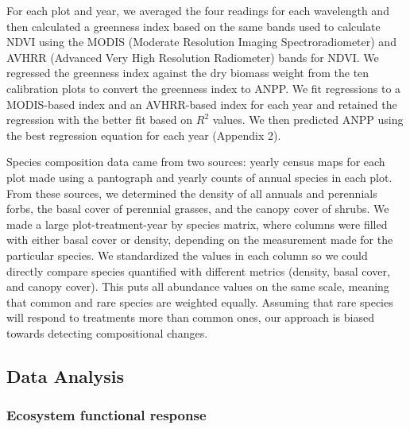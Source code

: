 \documentclass[fleqn,10pt,lineno]{wlpeerj} %
\begin{document}
For each plot and year, we averaged the four readings for each
wavelength and then calculated a greenness index based on the same bands
used to calculate NDVI using the MODIS (Moderate Resolution Imaging
Spectroradiometer) and AVHRR (Advanced Very High Resolution Radiometer)
bands for NDVI. We regressed the greenness index against the dry biomass
weight from the ten calibration plots to convert the greenness index to
ANPP. We fit regressions to a MODIS-based index and an AVHRR-based index
for each year and retained the regression with the better fit based on
\(R^2\) values. We then predicted ANPP using the best regression
equation for each year (Appendix 2).

Species composition data came from two sources: yearly census maps for
each plot made using a pantograph \citep{Hill1920} and yearly counts of
annual species in each plot. From these sources, we determined the
density of all annuals and perennials forbs, the basal cover of
perennial grasses, and the canopy cover of shrubs. We made a large
plot-treatment-year by species matrix, where columns were filled with
either basal cover or density, depending on the measurement made for the
particular species. We standardized the values in each column so we
could directly compare species quantified with different metrics
(density, basal cover, and canopy cover). This puts all abundance values
on the same scale, meaning that common and rare species are weighted
equally. Assuming that rare species will respond to treatments more than
common ones, our approach is biased towards detecting compositional
changes.

\hypertarget{data-analysis}{%
\subsection{Data Analysis}\label{data-analysis}}

\hypertarget{ecosystem-functional-response}{%
\subsubsection{Ecosystem functional
response}\label{ecosystem-functional-response}}
\end{document}
